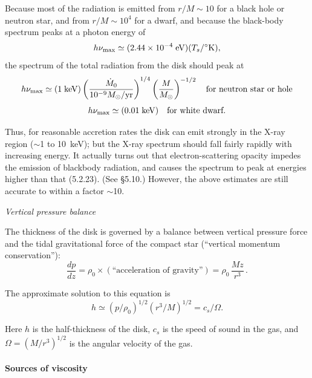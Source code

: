 Because most of the radiation is emitted from $r/M \sim 10$ for a black hole or
neutron star, and from $r/M \sim 10^4$ for a dwarf, and because the black-body
spectrum peaks at a photon energy of
\begin{equation}
h\nu_{\max} \simeq (2.44 \times 10^{-4}\;\text{eV})(T_s/{}^{\circ}\text{K}),
\notag
\end{equation}
the spectrum of the total radiation from the disk should peak at
\begin{equation}
h\nu_{\max} \simeq (1\;\text{keV})
\left(\frac{\dot{M}_0}{10^{-9} M_\odot/\text{yr}}\right)^{1/4}
\left(\frac{M}{M_\odot}\right)^{-1/2}
\quad \text{for neutron star or hole}
\notag
\end{equation}
\begin{equation}
h\nu_{\max} \simeq (0.01\;\text{keV})
\quad \text{for white dwarf.}
\notag
\end{equation}

Thus, for reasonable accretion rates the disk can emit strongly in the X-ray
region ($\sim$1 to 10~keV); but the X-ray spectrum should fall fairly rapidly with
increasing energy. It actually turns out that electron-scattering opacity impedes
the emission of blackbody radiation, and causes the spectrum to peak at energies
higher than that (5.2.23). (See \S5.10.) However, the above estimates are still
accurate to within a factor $\sim$10.


\textit{Vertical pressure balance}

The thickness of the disk is governed by a balance between vertical pressure force
and the tidal gravitational force of the compact star (``vertical momentum
conservation''):
\begin{equation}
\frac{dp}{dz} = \rho_0 \times \left(\text{``acceleration of gravity''}\right) = \rho_0\,\frac{Mz}{r^3}\,.
\tag{5.2.24}
\end{equation}

The approximate solution to this equation is
\begin{equation}
h \simeq (p/\rho_0)^{1/2}(r^3/M)^{1/2} = c_s/\Omega.
\tag{5.2.25}
\end{equation}

Here $h$ is the half-thickness of the disk, $c_s$ is the speed of sound in the gas, and
$\Omega = (M/r^3)^{1/2}$ is the angular velocity of the gas.

\paragraph*{Sources of viscosity}

